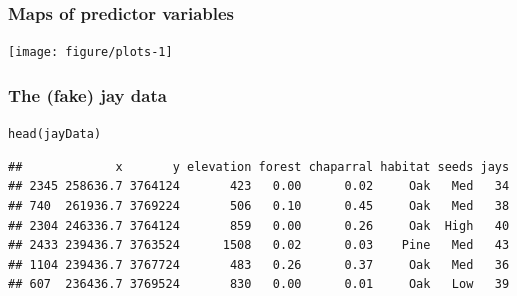 \documentclass[color=usenames,dvipsnames]{beamer}\usepackage[]{graphicx}\usepackage[]{color}
\makeatletter
\newcommand{\hlstd}[1]{\textcolor[rgb]{0,0,0}{#1}}%
\newcommand{\hlkwd}[1]{\textcolor[rgb]{0.004,0.004,0.506}{#1}}%
\newenvironment{kframe}{%
 \def\at@end@of@kframe{}%
 \ifinner\ifhmode%
  \def\at@end@of@kframe{\end{minipage}}%
  \begin{minipage}{\columnwidth}%
 \fi\fi%
 \def\FrameCommand##1{\hskip\@totalleftmargin \hskip-\fboxsep
 \colorbox{shadecolor}{##1}\hskip-\fboxsep
     \hskip-\linewidth \hskip-\@totalleftmargin \hskip\columnwidth}%
 \MakeFramed {\advance\hsize-\width
   \@totalleftmargin\z@ \linewidth\hsize
   \@setminipage}}%
 {\par\unskip\endMakeFramed%
 \at@end@of@kframe}
\newenvironment{knitrout}{}{} %
\makeatother
\begin{document}
\begin{frame}[fragile]
  \frametitle{Maps of predictor variables}

\texttt{[image: figure/plots-1]}
\end{frame}




\begin{frame}[fragile]
  \frametitle{The (fake) jay data}
\begin{knitrout}\scriptsize
{}\color{fgcolor}\begin{kframe}
\begin{alltt}
\hlkwd{head}\hlstd{(jayData)}
\end{alltt}
\begin{verbatim}
##             x       y elevation forest chaparral habitat seeds jays
## 2345 258636.7 3764124       423   0.00      0.02     Oak   Med   34
## 740  261936.7 3769224       506   0.10      0.45     Oak   Med   38
## 2304 246336.7 3764124       859   0.00      0.26     Oak  High   40
## 2433 239436.7 3763524      1508   0.02      0.03    Pine   Med   43
## 1104 239436.7 3767724       483   0.26      0.37     Oak   Med   36
## 607  236436.7 3769524       830   0.00      0.01     Oak   Low   39
\end{verbatim}
\end{kframe}
\end{knitrout}
\end{frame}
\end{document}
